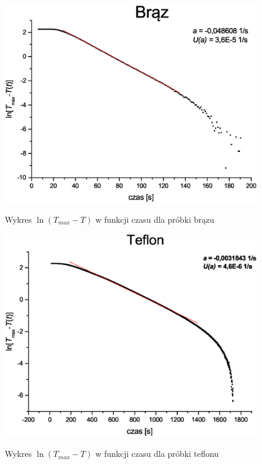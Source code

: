 \documentclass[11pt]{article}
\begin{document}
\begin{figure}[h!]
\begin{center}
\includegraphics[height=0.4\textheight]{brazg.eps}
\caption{Wykres $\ln (T_{max} - T)$ w funkcji czasu dla próbki brązu}{\label{WYK_BRAZ}}
\end{center}
\end{figure}

\begin{figure}[h!]
\begin{center}
\includegraphics[height=0.4\textheight]{teflong.eps}
\caption{Wykres $\ln (T_{max} - T)$ w funkcji czasu dla próbki teflonu}{\label{WYK_TEFLON}}
\end{center}
\end{figure}
\end{document}
